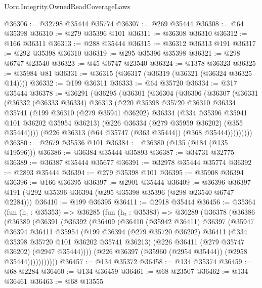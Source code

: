 \begin{lexlean}{Uorc.Integrity.OwnedReadCoverageLaws}
\begin{coremodule}
@36306 := @32798 @35444 @35774
@36307 := @269 @35444
@36308 := @64 @35398
@36310 := @279 @35396 @101
@36311 := @36308 @36310
@36312 := @166 @36311
@36313 := @288 @35444
@36315 := @36312 @36313 @191
@36317 := @292 @35398 @36310
@36319 := @295 @35396 @35398
@36321 := @298 @6747 @23540
@36323 := @45 @6747 @23540
@36324 := @1378 @36323
@36325 := @35984 @81
@36331 := @36315 (@36317 (@36319 (@36321 (@36324 @36325 @14))))
@36332 := @199 @36311
@36333 := @64 @35720
@36334 := @317 @35444
@36378 := @36291
    (@36295
      (@36301
        (@36304
          (@36306
            (@36307
              (@36331
                (@36332
                  (@36333 @36334)
                  @36313
                  (@220
                    @35398
                    @35720
                    @36310
                    @36334
                    @35741
                    (@199
                      @36310
                      (@279 @35941 @36202)
                      @36334
                      (@334 @35396 @35941 @101 @36202 @35954 @36213)
                      (@226 @36334 (@279 @35959 @36202) (@355 @35444))))
                  (@226 @36313 (@64 @35747 (@363 @35444)) (@368 @35444)))))))))
@36380 := @2679 @35536 @101
@36384 := @36380 (@135 (@184 (@135 @19596)))
@36386 := @36384 @35444 @35893
@36387 := @34731 @32775
@36389 := @36387 @35444 @35677
@36391 := @32978 @35444 @35774
@36392 := @2893 @35444
@36394 := @279 @35398 @101
@36395 := @35908 @36394
@36396 := @166 @36395
@36397 := @2901 @35444
@36409 := @36396 @36397 @191 (@292 @35396 @36394 (@295 @35398 @35396 (@298 @23540 @6747 @2284)))
@36410 := @199 @36395
@36411 := @2918 @35444
@36456 := @35364
    (fun (h₁ : @35353) =>
    @36285
      (fun (h₂ : @35383) =>
      @36289
        (@36378
          (@36386
            (@36389
              (@36391
                (@36392
                  (@36409
                    (@36410
                      (@35942 @36411)
                      @36397
                      (@35947
                        @36394
                        @36411
                        @35954
                        (@199
                          @36394
                          (@279 @35720 @36202)
                          @36411
                          (@334 @35398 @35720 @101 @36202 @35741 @36213)
                          (@226 @36411 (@279 @35747 @36202) (@2947 @35444))))
                      (@226 @36397 (@35960 (@2954 @35444)) (@2958 @35444)))))))))))
@36457 := @134 @35372
@36458 := @134 @35374
@36459 := @68 @2284
@36460 := @134 @36459
@36461 := @68 @23507
@36462 := @134 @36461
@36463 := @68 @13555

\end{coremodule}
\end{lexlean}
